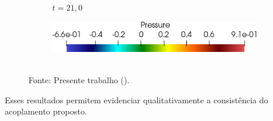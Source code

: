 \begin{figure}[h!]
\begin{subfigure}[b]{0.3\textwidth}
        \caption{$t=21,0$}
    \end{subfigure}
    \begin{subfigure}[b]{0.4\textwidth}
        \includegraphics[width=\linewidth]{Figuras/FSI-Cavity2D/legenda.png}
    \end{subfigure}
    \\Fonte: Presente trabalho (\the\year).
    \label{fig:cavity2D-time}
\end{figure}

Esses resultados permitem evidenciar qualitativamente a consistência do acoplamento proposto.



